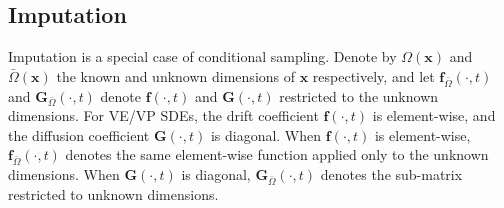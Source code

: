 \documentclass{article} \usepackage{iclr2021_conference,times}
\newcommand{\bfx}{\mathbf{x}}
\newcommand{\bff}{\mathbf{f}}
\newcommand{\bfG}{\mathbf{G}}
\newcommand{\bomega}{{\bar{\Omega}}}
\begin{document}
\subsection{Imputation} \label{app:imputation}
Imputation is a special case of conditional sampling. Denote by $\Omega(\bfx)$ and $\bomega(\bfx)$ the known and unknown dimensions of $\bfx$ respectively, and let $\bff_{\bomega}(\cdot, t)$ and $\bfG_{\bomega}(\cdot, t)$ denote $\bff(\cdot, t)$ and $\bfG(\cdot, t)$ restricted to the unknown dimensions. For VE/VP SDEs, the drift coefficient $\bff(\cdot, t)$ is element-wise, and the diffusion coefficient $\bfG(\cdot, t)$ is diagonal. When $\bff(\cdot, t)$ is element-wise, $\bff_{\bomega}(\cdot, t)$ denotes the same element-wise function applied only to the unknown dimensions. When $\bfG(\cdot, t)$ is diagonal, $\bfG_{\bomega}(\cdot, t)$ denotes the sub-matrix restricted to unknown dimensions. 
\end{document}
